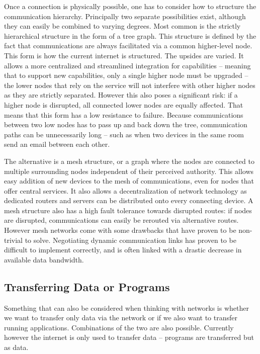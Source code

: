 \documentclass{acm_proc_article-sp}
\begin{document}
Once a connection is physically possible, one has to consider how to structure the communication hierarchy.
Principally two separate possibilities exist, although they can easily be combined to varying degrees.
Most common is the strictly hierarchical structure in the form of a tree graph.
This structure is defined by the fact that communications are always facilitated via a common higher-level node.
This form is how the current internet is structured.
The upsides are varied.
It allows a more centralized and streamlined integration for capabilities – meaning that to support new capabilities, only a single higher node must be upgraded – the lower nodes that rely on the service will not interfere with other higher nodes as they are strictly separated.
However this also poses a significant risk: if a higher node is disrupted, all connected lower nodes are equally affected.
That means that this form has a low resistance to failure.
Because communications between two low nodes has to pass up and back down the tree, communication paths can be unnecessarily long – such as when two devices in the same room send an email between each other.

The alternative is a mesh structure, or a graph where the nodes are connected to multiple surrounding nodes independent of their perceived authority.
This allows easy addition of new devices to the mesh of communications, even for nodes that offer central services.
It also allows a decentralization of network technology as dedicated routers and servers can be distributed onto every connecting device.
A mesh structure also has a high fault tolerance towards disrupted routes: if nodes are disrupted, communications can easily be rerouted via alternative routes.
However mesh networks come with some drawbacks that have proven to be non-trivial to solve.
Negotiating dynamic communication links has proven to be difficult to implement correctly, and is often linked with a drastic decrease in available data bandwidth.

\subsection{Transferring Data or Programs}

Something that can also be considered when thinking with networks is whether we want to transfer only data via the network or if we also want to transfer running applications.
Combinations of the two are also possible.
Currently however the internet is only used to transfer data – programs are transferred but as data.
\end{document}
